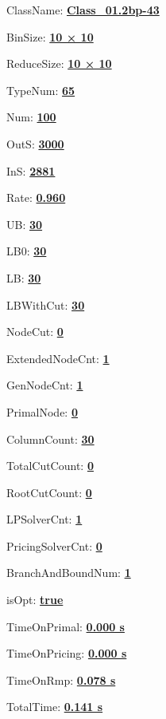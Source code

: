 \documentclass[11pt]{article}
\begin{document}
\pagestyle{empty}


ClassName: \underline{\textbf{Class_01.2bp-43}}
\par
BinSize: \underline{\textbf{10 × 10}}
\par
ReduceSize: \underline{\textbf{10 × 10}}
\par
TypeNum: \underline{\textbf{65}}
\par
Num: \underline{\textbf{100}}
\par
OutS: \underline{\textbf{3000}}
\par
InS: \underline{\textbf{2881}}
\par
Rate: \underline{\textbf{0.960}}
\par
UB: \underline{\textbf{30}}
\par
LB0: \underline{\textbf{30}}
\par
LB: \underline{\textbf{30}}
\par
LBWithCut: \underline{\textbf{30}}
\par
NodeCut: \underline{\textbf{0}}
\par
ExtendedNodeCnt: \underline{\textbf{1}}
\par
GenNodeCnt: \underline{\textbf{1}}
\par
PrimalNode: \underline{\textbf{0}}
\par
ColumnCount: \underline{\textbf{30}}
\par
TotalCutCount: \underline{\textbf{0}}
\par
RootCutCount: \underline{\textbf{0}}
\par
LPSolverCnt: \underline{\textbf{1}}
\par
PricingSolverCnt: \underline{\textbf{0}}
\par
BranchAndBoundNum: \underline{\textbf{1}}
\par
isOpt: \underline{\textbf{true}}
\par
TimeOnPrimal: \underline{\textbf{0.000 s}}
\par
TimeOnPricing: \underline{\textbf{0.000 s}}
\par
TimeOnRmp: \underline{\textbf{0.078 s}}
\par
TotalTime: \underline{\textbf{0.141 s}}
\par
\newpage


\end{document}
